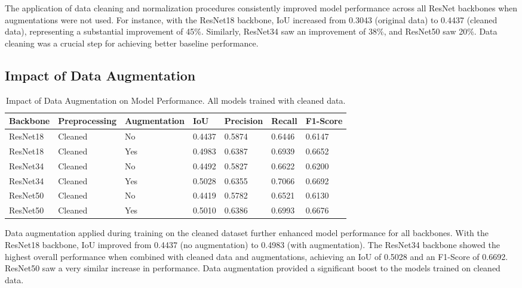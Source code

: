 \documentclass{article}
\begin{document}
The application of data cleaning and normalization procedures consistently improved model performance across all ResNet backbones when augmentations were not used. For instance, with the ResNet18 backbone, IoU increased from 0.3043 (original data) to 0.4437 (cleaned data), representing a substantial improvement of 45\%. Similarly, ResNet34 saw an improvement of 38\%, and ResNet50 saw 20\%. Data cleaning was a crucial step for achieving better baseline performance.

\subsection{Impact of Data Augmentation} %

\begin{table}[htbp] %
  \caption{Impact of Data Augmentation on Model Performance. All models trained with cleaned data.}
  \label{table:augmentation_impact}
  \centering
  \begin{tabular}{lllllll}
    \toprule
    Backbone & Preprocessing & Augmentation & IoU    & Precision & Recall & F1-Score \\
    \midrule
    ResNet18 & Cleaned       & No           & 0.4437 & 0.5874    & 0.6446 & 0.6147   \\
    ResNet18 & Cleaned       & Yes          & 0.4983 & 0.6387    & 0.6939 & 0.6652   \\
    ResNet34 & Cleaned       & No           & 0.4492 & 0.5827    & 0.6622 & 0.6200   \\
    ResNet34 & Cleaned       & Yes          & 0.5028 & 0.6355    & 0.7066 & 0.6692   \\
    ResNet50 & Cleaned       & No           & 0.4419 & 0.5782    & 0.6521 & 0.6130   \\
    ResNet50 & Cleaned       & Yes          & 0.5010 & 0.6386    & 0.6993 & 0.6676   \\
    \bottomrule
  \end{tabular}
\end{table}

Data augmentation applied during training on the cleaned dataset further enhanced model performance for all backbones. With the ResNet18 backbone, IoU improved from 0.4437 (no augmentation) to 0.4983 (with augmentation). The ResNet34 backbone showed the highest overall performance when combined with cleaned data and augmentations, achieving an IoU of 0.5028 and an F1-Score of 0.6692. ResNet50 saw a very similar increase in performance. Data augmentation provided a significant boost to the models trained on cleaned data.
\end{document}
